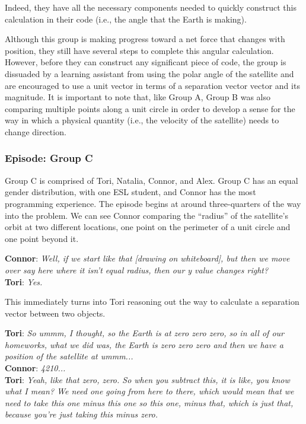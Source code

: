 \documentclass{msuphddissertation}
\begin{document}
\begin{doublespace}
Indeed, they have all the necessary components needed to quickly construct this calculation in their code (i.e., the angle that the Earth is making).

Although this group is making progress toward a net force that changes with position, they still have several steps to complete this angular calculation.  However, before they can construct any significant piece of code, the group is dissuaded by a learning assistant from using the polar angle of the satellite and are encouraged to use a unit vector in terms of a separation vector vector and its magnitude.  It is important to note that, like Group A,  Group B was also comparing multiple points along a unit circle in order to develop a sense for the way in which a physical quantity (i.e., the velocity of the satellite) needs to change direction.

%
%

\subsubsection{Episode: Group C}

Group C is comprised of Tori, Natalia, Connor, and Alex.  Group C has an equal gender distribution, with one ESL student, and Connor has the most programming experience.  The episode begins at around three-quarters of the way into the problem.  We can see Connor comparing the ``radius'' of the satellite's orbit at two different locations, one point on the perimeter of a unit circle and one point beyond it.

\vspace*{4pt}
\noindent\textbf{Connor}: {\it Well, if we start like that [drawing on whiteboard], but then we move over say here where it isn't equal radius, then our y value changes right?}\\
\textbf{Tori}: {\it Yes.}
\vspace*{4pt}

This immediately turns into Tori reasoning out the way to calculate a separation vector between two objects.

\vspace*{4pt}
\noindent\textbf{Tori}: {\it So ummm, I thought, so the Earth is at zero zero zero, so in all of our homeworks, what we did was, the Earth is zero zero zero and then we have a position of the satellite at ummm...}\\
\textbf{Connor}: {\it 4210...}\\
\textbf{Tori}: {\it Yeah, like that zero, zero.  So when you subtract this, it is like, you know what I mean?  We need one going from here to there, which would mean that we need to take this one minus this one so this one, minus that, which is just that, because you're just taking this minus zero.}
\vspace*{4pt}


\end{doublespace}
\end{document}
